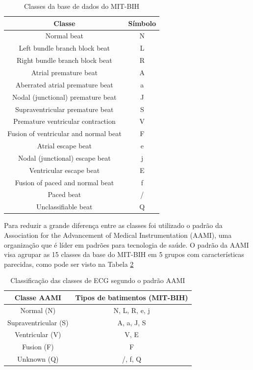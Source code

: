 \begin{table}[ht]
  \caption{Classes da base de dados do MIT-BIH}
  \label{tab: table1}
  \centering

  \begin{tabular}{cc}
    \hline
    \bfseries Classe & \bfseries Símbolo\\
    \hline
    Normal beat & N\\
    Left bundle branch block beat & L\\
    Right bundle branch block beat & R\\
    Atrial premature beat & A\\
    Aberrated atrial premature beat & a\\
    Nodal (junctional) premature beat & J\\
    Supraventricular premature beat & S\\
    Premature ventricular contraction & V\\
    Fusion of ventricular and normal beat & F\\
    Atrial escape beat & e\\
    Nodal (junctional) escape beat & j\\
    Ventricular escape beat & E\\
    Fusion of paced and normal beat & f\\
    Paced beat & /\\
    Unclassifiable beat & Q\\
    \hline
  \end{tabular}

  \source
\end{table}

Para reduzir a grande diferença entre as classes foi utilizado o padrão da Association for the Advancement of Medical Instrumentation (AAMI), 
uma organização que é líder em padrões para tecnologia de saúde. O padrão da AAMI visa agrupar as 15 classes da base do MIT-BIH em 5 grupos 
com características parecidas, como pode ser visto na Tabela \ref{tab: table2}

\begin{table}[ht]
  \caption{Classificação das classes de ECG segundo o padrão AAMI}
  \label{tab: table2}
  \centering
  \begin{tabular}{cc}
    \hline
    \bfseries Classe AAMI & \bfseries Tipos de batimentos (MIT-BIH) \\
    \hline
    Normal (N) & N, L, R, e, j \\
    Supraventricular (S) & A, a, J, S \\
    Ventricular (V) & V, E \\
    Fusion (F) & F \\
    Unknown (Q) & /, f, Q \\
    \hline
  \end{tabular}

\end{table}


